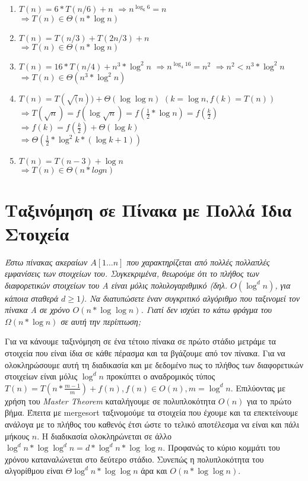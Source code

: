 \documentclass[a4paper,10pt]{article} \usepackage{anysize}
\begin{document}
\begin{enumerate}
\begin{enumerate}
\item $T(n) = 6*T(n/6)+n$
$\Rightarrow n^{\log _6 {6}} = n$\\
$\Rightarrow T(n) \in \Theta(n*\log {n})$

\item $T(n) = T(n/3) + T(2n/3) + n$\\
$\Rightarrow T(n) \in \Theta(n*\log{n})$

\item $T(n) = 16*T(n/4) + n^3*\log^2{n}$
$\Rightarrow n^{\log _4{16}} = n^2$
$\Rightarrow n^2 < n^3*\log^2{n}$\\
$\Rightarrow T(n) \in \Theta(n^3*\log^2{n})$

\item $T(n) = T(\sqrt(n)) + \Theta(\log{\log{n}})$
$(k=\log{n},f(k)=T(n))$\\
$\Rightarrow
T(\sqrt{n})=f(\log{\sqrt{n}})=f(\frac{1}{2}*\log{n})=f(\frac{k}{2}) $\\
$\Rightarrow f(k)=f(\frac{k}{2})+\Theta(\log{k})$\\
$\Rightarrow \Theta(\frac{1}{2}*\log^2{k}*(\log{k}+1))$

\item $T(n) = T(n-3) + \log{n}$\\
$\Rightarrow T(n) \in \Theta(n*logn)$

\end{enumerate}
\end{enumerate}
\pagebreak
\section{Ταξινόμηση σε Πίνακα με Πολλά Ίδια Στοιχεία}
\textit{Έστω πίνακας ακεραίων $A[1...n]$ που χαρακτηρίζεται από πολλές
πολλαπλές εμφανίσεις των στοιχείων του. Συγκεκριμένα, θεωρούμε ότι το πλήθος
των διαφορετικών στοιχείων του Α είναι μόλις πολυλογαριθμικό (δηλ.
$O(\log^d{n})$, για κάποια σταθερά $d \geq 1$). Να διατυπώσετε έναν συγκριτικό
αλγόριθμο που ταξινομεί τον πίνακα Α σε χρόνο $O(n*\log{\log{n}})$. Γιατί δεν
ισχύει το κάτω φράγμα του $\Omega({n*\log{n}})$ σε αυτή την περίπτωση;} \vspace{0.4cm}

Για να κάνουμε ταξινόμηση σε ένα τέτοιο πίνακα σε πρώτο στάδιο μετράμε τα
στοιχεία που είναι ίδια σε κάθε πέρασμα και τα βγάζουμε από τον πίνακα. Για να
ολοκληρώσουμε αυτή τη διαδικασία και με δεδομένο πως το πλήθος των
διαφορετικών στοιχείων είναι μόλις $\log^d{n}$ προκύπτει ο αναδρομικός τύπος
$T(n)=T(n*\frac{m-1}{m})+f(n),f(n) \in O(n),m=\log^d{n}$. Επιλύοντας με χρήση
του \textit{Master Theorem} καταλήγουμε σε πολυπλοκότητα $O(n)$ για το πρώτο
βήμα. Έπειτα με mergesort ταξινομούμε τα στοιχεία που έχουμε και τα
επεκτείνουμε ανάλογα με το πλήθος του καθενός έτσι ώστε το τελικό αποτέλεσμα 
να είναι και πάλι μήκους $n$. Η διαδικασία ολοκληρώνεται σε άλλο
$\log^d{n}*\log{\log^d{n}}=d*\log^d{n}*\log{\log{n}}$. Προφανώς το κύριο
κομμάτι του χρόνου  καταναλώνεται στο δεύτερο στάδιο. Συνεπώς η πολυπλοκότητα
του αλγορίθμου είναι $\Theta{\log^d{n}*\log{\log{n}} }$ άρα και
$O(n*\log{\log{n}})$.
\end{document}
